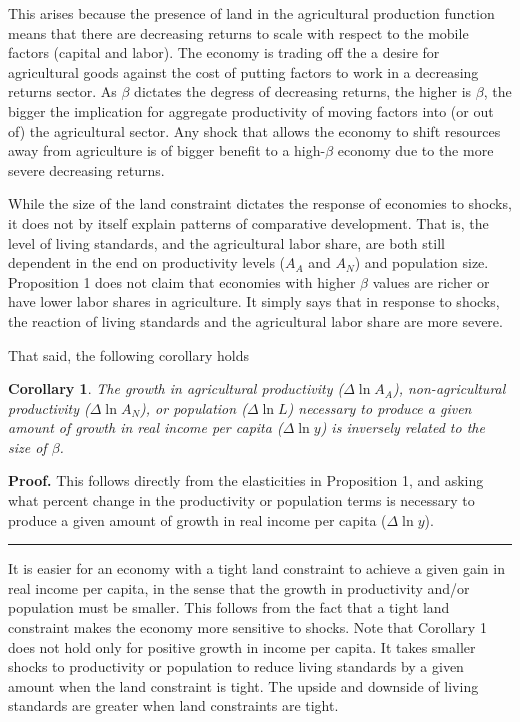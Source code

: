\documentclass[11pt]{article}
\newtheorem{corollary}{Corollary}
\newenvironment{proof}[1][Proof]{\noindent\textbf{#1.} }{\ \rule{0.5em}{0.5em}}
\begin{document}
This arises because the presence of land in the agricultural production function means that there are decreasing returns to scale with respect to the mobile factors (capital and labor). The economy is trading off the a desire for agricultural goods against the cost of putting factors to work in a decreasing returns sector. As $\beta$ dictates the degress of decreasing returns, the higher is $\beta$, the bigger the implication for aggregate productivity of moving factors into (or out of) the agricultural sector. Any shock that allows the economy to shift resources away from agriculture is of bigger benefit to a high-$\beta$ economy due to the more severe decreasing returns. 

While the size of the land constraint dictates the response of economies to shocks, it does not by itself explain patterns of comparative development. That is, the level of living standards, and the agricultural labor share, are both still dependent in the end on productivity levels ($A_A$ and $A_N$) and population size. Proposition 1 does not claim that economies with higher $\beta$ values are richer or have lower labor shares in agriculture. It simply says that in response to shocks, the reaction of living standards and the agricultural labor share are more severe. 

That said, the following corollary holds

\begin{corollary}
	The growth in agricultural productivity ($\Delta \ln A_A$), non-agricultural productivity ($\Delta \ln A_N$), or population ($\Delta \ln L$) necessary to produce a given amount of growth in real income per capita ($\Delta \ln y$) is inversely related to the size of $\beta$. 
\end{corollary}
\begin{proof}
This follows directly from the elasticities in Proposition 1, and asking what percent change in the productivity or population terms is necessary to produce a given amount of growth in real income per capita ($\Delta \ln y$).
\end{proof}

\vspace{.3cm} It is easier for an economy with a tight land constraint to achieve a given gain in real income per capita, in the sense that the growth in productivity and/or population must be smaller. This follows from the fact that a tight land constraint makes the economy more sensitive to shocks. Note that Corollary 1 does not hold only for positive growth in income per capita. It takes smaller shocks to productivity or population to reduce living standards by a given amount when the land constraint is tight. The upside and downside of living standards are greater when land constraints are tight.
\end{document}
